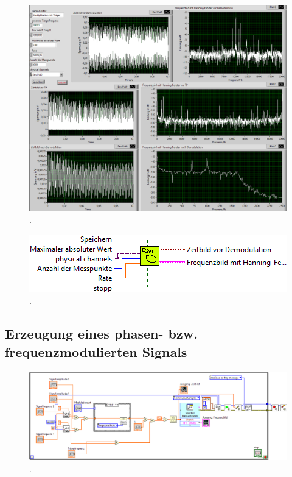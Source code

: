 \documentclass[
a4paper,
12pt,
pagesize,
ngerman
]{scrartcl}
\begin{document}
	\begin{figure}[h]
		\centering
		\includegraphics[width=1.0\textwidth]{EIRE2018Dateien/Tag4/traegerMultOszi/Oszilloskop__modifiziertp}
		\caption{.}
	\end{figure}

	\begin{figure}[h]
		\centering
		\includegraphics[width=1.0\textwidth]{EIRE2018Dateien/Tag4/traegerMultOszi/Oszilloskop__modifiziertc}
		\caption{.}
	\end{figure}
	
	\subsection{Erzeugung eines phasen- bzw. frequenzmodulierten Signals}
	
	\begin{figure}[h]
		\centering
		\includegraphics[width=1.0\textwidth]{EIRE2018Dateien/Tag4/FMPM-Erzeugung/FMPM-Erzeugungd}
		\caption{.}
	\end{figure}
\end{document}
